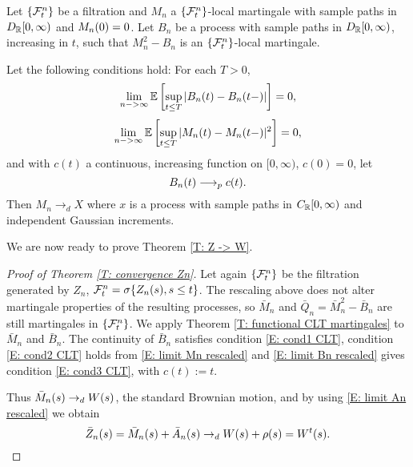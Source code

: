 \begin{theorem} \label{T: functional CLT martingales}
	Let $\{\mathcal{F}^n_{t}\}$ be a filtration and $M_n$ a $\{\mathcal{F}^n_{t}\}$-local martingale with sample paths in $D_{\mathbb{R}}[0,\infty)$ and $M_n(0)=0$.
	Let $B_n$ be a process with sample paths in $D_{\mathbb{R}}[0,\infty)$, increasing in $t$, such that $M_n^2 - B_n$ is an $\{\mathcal{F}^n_{t}\}$-local martingale.
	
	Let the following conditions hold:
	For each $T>0$,
	\begin{equation} \label{E: cond1 CLT}
	\lim_{n->\infty} \mathbb{E} \left[ 
	\sup_{t \leq T} | B_n(t) - B_n(t-)|
     \right] = 0,
	\end{equation}
	\begin{equation} \label{E: cond2 CLT}
	\lim_{n->\infty} \mathbb{E} \left[ 
		\sup_{t \leq T} | M_n(t) - M_n(t-)|^2
	 \right] = 0,
	\end{equation}
	and with $c(t)$ a continuous, increasing function on $[0, \infty)$, $c(0) = 0$, let
	\begin{equation} \label{E: cond3 CLT}
	B_n(t) \longrightarrow_p c(t).
	\end{equation}
	Then $M_n \longrightarrow_d X$ where $x$ is a process with sample paths in $C_{\mathbb{R}}[0,\infty)$ and independent Gaussian increments.
\end{theorem}


We are now ready to prove Theorem \eqref{T: Z -> W}.

\begin{proof}[Proof of Theorem \eqref{T: convergence Zn}]
	Let again $\{\mathcal{F}^n_{t}\}$ be the filtration generated by $Z_n$, 
	$\mathcal{F}^n_{t} = \sigma \{ Z_n(s), s \leq t \}$.
	The rescaling above does not alter martingale properties of the resulting processes,
	so $\bar{M}_n$ and $\bar{Q}_n = \bar{M}_n^2 - \bar{B}_n$ are still martingales in $\{\mathcal{F}^n_{t}\}$.
	We apply Theorem \eqref{T: functional CLT martingales} to $\bar{M}_n$ and $\bar{B}_n$.
	The continuity of $\bar{B}_n$ satisfies condition \eqref{E: cond1 CLT}, 
	condition \eqref{E: cond2 CLT} holds from \eqref{E: limit Mn rescaled}
	and \eqref{E: limit Bn rescaled} gives condition \eqref{E: cond3 CLT}, with $c(t) := t$.
	
	Thus $\bar{M}_n(s) \rightarrow_d W(s)$, the standard Brownian motion, and by using \eqref{E: limit An rescaled} we obtain
	\begin{equation*}
	\bar{Z}_n(s) = \bar{M}_n(s) + \bar{A}_n(s) \rightarrow_d W(s) + \rho (s) = W^t(s).
	\end{equation*}
			
\end{proof}

